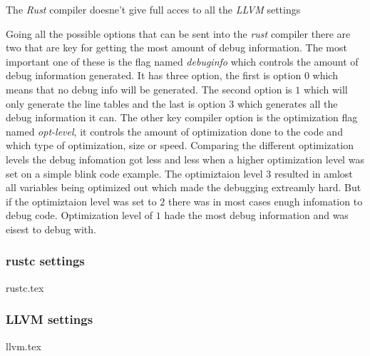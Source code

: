 

The \emph{Rust} compiler doesne't give full acces to all the \emph{LLVM} settings 


Going all the possible options that can be sent into the \emph{rust} compiler there are two that are key for getting the most amount of debug information.
The most important one of these is the flag named \emph{debuginfo} which controls the amount of debug information generated.
It has three option, the first is option $0$ which means that no debug info will be generated.
The second option is $1$ which will only generate the line tables and the last is option $3$ which generates all the debug information it can.
The other key compiler option is the optimization flag named \emph{opt-level}, it controls the amount of optimization done to the code and which type of optimization, size or speed.
Comparing the different optimization levels the debug infomation got less and less when a higher optimization level was set on a simple blink code example.
The optimiztaion level $3$ resulted in amlost all variables being optimized out which made the debugging extreamly hard.
But if the optimiztaion level was set to $2$ there was in most cases enugh infomation to debug code.
Optimization level of $1$ hade the most debug information and was eisest to debug with.


\subsubsection{rustc settings}
{rustc.tex}


\subsubsection{LLVM settings}
{llvm.tex}

